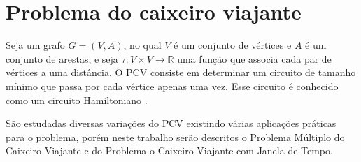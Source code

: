 


\section{Problema do caixeiro viajante}


Seja um grafo $G = (V,A)$, no qual $V$ é um conjunto de vértices e $A$ é um conjunto de arestas, e seja $\tau:V\times V \rightarrow \mathds{R}$ uma função que associa cada par de vértices a uma distância. O \ac{PCV} consiste em determinar um circuito de tamanho mínimo que passa por cada vértice apenas uma vez. Esse circuito é conhecido como um circuito Hamiltoniano \cite{laporte:1992}.

São estudadas diversas variações do \ac{PCV} existindo várias aplicações práticas para o problema, porém neste trabalho serão descritos o Problema Múltiplo do Caixeiro Viajante e do Problema o Caixeiro Viajante com Janela de Tempo. 


